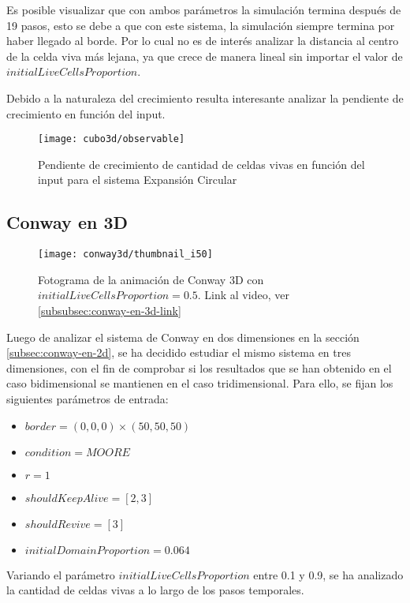 Es posible visualizar que con ambos parámetros la simulación termina después de 19 pasos, esto se debe a que con este sistema, la simulación
siempre termina por haber llegado al borde. Por lo cual no es de interés analizar la distancia al centro de la celda viva más lejana, ya que
crece de manera lineal sin importar el valor de $initialLiveCellsProportion$.

Debido a la naturaleza del crecimiento resulta interesante analizar la pendiente de crecimiento en función del input.


\begin{figure}[H]
    \centering
    \texttt{[image: cubo3d/observable]}
    \caption{Pendiente de crecimiento de cantidad de celdas vivas en función del input para el sistema Expansión Circular}
    \label{fig:cubo3d_observable}
\end{figure}


\subsection{Conway en 3D}\label{subsec:conway-en-3d}

\begin{figure}[H]
    \centering
    \texttt{[image: conway3d/thumbnail\_i50]}
    \caption{Fotograma de la animación de Conway 3D con $initialLiveCellsProportion = 0.5$. Link al video, ver \ref{subsubsec:conway-en-3d-link}}
    \label{fig:thumbnailconway3d_i50}
\end{figure}

Luego de analizar el sistema de Conway en dos dimensiones en la sección \ref{subsec:conway-en-2d},
se ha decidido estudiar el mismo sistema en tres dimensiones, con el fin de comprobar si los resultados
que se han obtenido en el caso bidimensional se mantienen en el caso tridimensional.
Para ello, se fijan los siguientes parámetros de entrada:
\begin{itemize}
    \item $border = (0, 0, 0) \times (50, 50, 50)$
    \item $condition = MOORE$
    \item $r = 1$
    \item $shouldKeepAlive = [2, 3]$
    \item $shouldRevive = [3]$
    \item $initialDomainProportion = 0.064$
\end{itemize}

Variando el parámetro $initialLiveCellsProportion$ entre 0.1 y 0.9, se ha analizado la cantidad de celdas vivas
a lo largo de los pasos temporales.


